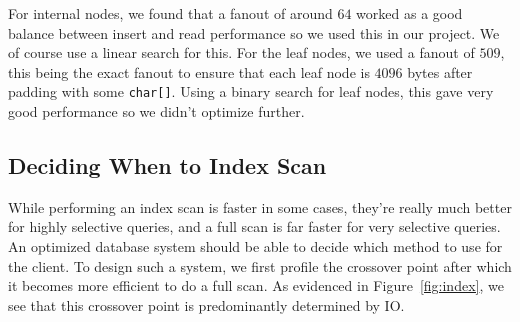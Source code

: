 \documentclass[a4paper, 12pt]{article}
\begin{document}
\medskip
For internal nodes, we found that a fanout of around $64$ worked as a good balance between insert and read performance so we used this in our project. We of course use a linear search for this. For the leaf nodes, we used a fanout of $509$, this being the exact fanout to ensure that each leaf node is $4096$ bytes after padding with some \texttt{char[]}. Using a binary search for leaf nodes, this gave very good performance so we didn't optimize further. 

\subsection{Deciding When to Index Scan}

While performing an index scan is faster in some cases, they're really much better for highly selective queries, and a full scan is far faster for very selective queries. An optimized database system should be able to decide which method to use for the client. To design such a system, we first profile the crossover point after which it becomes more efficient to do a full scan. As evidenced in Figure~\ref{fig:index}, we see that this crossover point is predominantly determined by IO.
\end{document}
